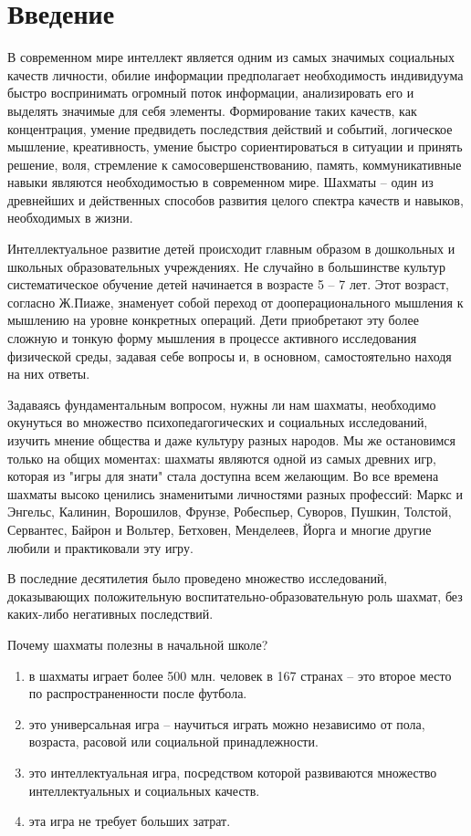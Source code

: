 \chapter*{Введение}

В современном мире интеллект является одним из самых значимых социальных качеств личности, обилие информации предполагает необходимость индивидуума быстро воспринимать огромный поток информации, анализировать его и выделять значимые для себя элементы. Формирование таких качеств, как концентрация, умение предвидеть последствия действий и событий, логическое мышление, креативность, умение быстро сориентироваться в ситуации и принять решение, воля, стремление к самосовершенствованию, память, коммуникативные навыки являются необходимостью в современном мире. Шахматы -- один из древнейших и действенных способов развития целого спектра качеств и навыков, необходимых в жизни.

Интеллектуальное развитие детей происходит главным образом в дошкольных и школьных образовательных учреждениях. Не случайно в большинстве культур систематическое обучение детей начинается в возрасте 5 -- 7 лет. Этот возраст, согласно Ж.Пиаже, знаменует собой переход от дооперационального мышления к мышлению на уровне конкретных операций. Дети приобретают эту более сложную и тонкую форму мышления в процессе активного исследования физической среды, задавая себе вопросы и, в основном, самостоятельно находя на них ответы.

Задаваясь фундаментальным вопросом, нужны ли нам шахматы, необходимо окунуться во множество психопедагогических и социальных исследований, изучить мнение общества и даже культуру разных народов. Мы же остановимся только на общих моментах: шахматы являются одной из самых древних игр, которая из "игры для знати" стала доступна всем желающим. Во все времена шахматы высоко ценились знаменитыми личностями разных профессий: Маркс и Энгельс, Калинин, Ворошилов, Фрунзе, Робеспьер, Суворов, Пушкин, Толстой, Сервантес, Байрон и Вольтер, Бетховен, Менделеев, Йорга и многие другие любили и практиковали эту игру.

В последние десятилетия было проведено множество исследований, доказывающих положительную воспитательно-образовательную роль шахмат, без каких-либо негативных последствий.

Почему шахматы полезны в начальной школе?

\begin{enumerate}
\item в шахматы играет более 500 млн. человек в 167 странах -- это второе место по распространенности после футбола.
\item это универсальная игра -- научиться играть можно независимо от пола, возраста, расовой или социальной принадлежности.
\item это интеллектуальная игра, посредством которой развиваются множество интеллектуальных и социальных качеств.
\item эта игра не требует больших затрат.
\end{enumerate}

